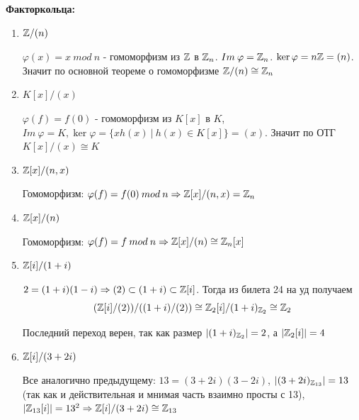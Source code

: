 \par \textbf{Факторкольца:}
\begin{enumerate}
    \item $\mathbb{Z} / (n)$
    \par $\varphi(x)=x \: mod \: n$ - гомоморфизм из $\mathbb{Z}$ в $\mathbb{Z}_n$. $Im \: \varphi=\mathbb{Z}_n$. $\ker \varphi=n\mathbb{Z}=(n)$. Значит по основной теореме о гомоморфизме $\mathbb{Z}/(n) \cong \mathbb{Z}_n$
    
    \item $K[x]/(x)$
    \par $\varphi(f)=f(0)$ - гомоморфизм из $K[x]$ в $K$, $Im \:  \varphi = K, \ker \varphi=\{x h(x) \: | \: h(x) \in K[x]\}=(x)$. Значит по ОТГ $K[x]/(x) \cong K$
    
    \item $\mathbb{Z}[x] / (n,x)$
    \par Гомоморфизм: $\varphi(f)=f(0) \: mod \: n \Rightarrow \mathbb{Z}[x]/(n,x)=\mathbb{Z}_n$
    
    \item $\mathbb{Z}[x]/(n)$
    \par Гомоморфизм: $\varphi(f)=f \: mod \: n \Rightarrow \mathbb{Z}[x]/(n) \cong \mathbb{Z}_n[x]$
    
    \item $\mathbb{Z}[i]/(1+i)$
    \par $2=(1+i)(1-i) \Rightarrow (2) \subset (1+i) \subset \mathbb{Z}[i]$. Тогда из билета 24 на уд получаем $$(\mathbb{Z}[i]/(2)) / ((1+i) / (2)) \cong \mathbb{Z}_2[i] / (1+i)_{\mathbb{Z}_2} \cong \mathbb{Z}_2$$
    \par Последний переход верен, так как размер $|(1+i)_{\mathbb{Z}_2}|=2$, а $|\mathbb{Z}_2[i]|=4$
    
    \item $\mathbb{Z}[i]/(3+2i)$
    \par Все аналогично предыдущему: $13=(3+2i)(3-2i)$, $|(3+2i)_{\mathbb{Z}_{13}}|=13$ (так как и действительная и мнимая часть взаимно просты с 13), $|\mathbb{Z}_{13}[i]|=13^2 \Rightarrow \mathbb{Z}[i]/(3+2i) \cong \mathbb{Z}_{13}$
\end{enumerate}


